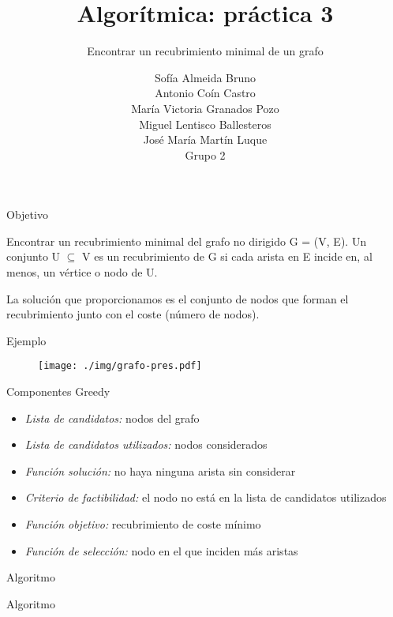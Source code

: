 \documentclass[spanish]{beamer}
\title{Algorítmica: práctica 3}
\subtitle{Encontrar un recubrimiento minimal de un grafo}
\author{Sofía Almeida Bruno\\ Antonio Coín Castro\\ María Victoria Granados Pozo\\ Miguel Lentisco Ballesteros\\ José María Martín Luque\\ \vspace{1em}Grupo 2}
\begin{document}
\maketitle

\begin{frame}{Objetivo}

	Encontrar un recubrimiento minimal del grafo no dirigido G = (V, E).
	Un conjunto U $\subseteq$ V es un recubrimiento de G si cada arista en E incide en, al menos, un vértice o nodo de U.

	La solución que proporcionamos es el conjunto de nodos que forman el recubrimiento junto con el coste (número de nodos).
\end{frame}

\begin{frame}{Ejemplo}
	\begin{figure}[H]
		\centering \texttt{[image: ./img/grafo-pres.pdf]}
	\end{figure}
\end{frame}

\begin{frame}{Componentes Greedy}
	\begin{itemize}
		\item \textit{Lista de candidatos:} nodos del grafo
		\item \textit{Lista de candidatos utilizados:} nodos considerados
		\item \textit{Función solución:} no haya ninguna arista sin considerar
		\item \textit{Criterio de factibilidad:} el nodo no está en la lista de candidatos utilizados
		\item \textit{Función objetivo:} recubrimiento de coste mínimo
		\item \textit{Función de selección:} nodo en el que inciden más aristas
	\end{itemize}
\end{frame}

\begin{frame}
    
\end{frame}

\begin{frame}{Algoritmo}
	
\end{frame}

\begin{frame}{Algoritmo}
	
\end{frame}
\end{document}

